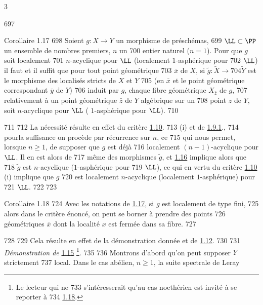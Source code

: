3	\documentclass[10pt]{../fichiers-configuration-latex/smfart}
\begin{document}
   697	\begin{enonce*}{Corollaire 1.17}
   698	Soient $g:X\rightarrow Y$ un morphisme de préschémas,
   699	$\LL\subset \PP$ un ensemble de nombres premiers, $n$ un
   700	entier naturel (\resp $n=1$). Pour que $g$ soit localement
   701	$n$-acyclique pour $\LL$ (\resp localement $1$-asphérique pour
   702	$\LL$) il faut et il suffit que pour tout point géométrique
   703	$\bar{x}$ de $X$, si $\widetilde{g}:\widetilde{X}\rightarrow
   704	\widetilde{Y}$ est le morphisme des localisés stricts de $X$ et $Y$
   705	(en $\bar{x}$ et le point géométrique correspondant $\bar{y}$ de $Y$)
   706	induit par $g$, chaque fibre géométrique $X_{\bar{z}}$ de $g$,
   707	relativement à un point géométrique $\bar{z}$ de $Y$ algébrique sur un
   708	point $z$ de $Y$, soit $n$-acyclique pour $\LL$ (	$1$-asphérique pour $\LL$).
   710	\end{enonce*}
   711	
   712	La nécessité résulte en effet du critère \hyperref[XV.prop1.10]{1.10}. 
   713	(i) et de \hyperref[XV.cor1.9.1]{1.9.1}.,
   714	pour\pageoriginale la suffisance on procède par récurrence sur $n$, ce
   715	qui nous permet, lorsque $n\geq 1$, de supposer que $g$ est déjà
   716	localement $(n-1)$-acyclique pour $\LL$. Il en est alors de
   717	même des morphismes $\widetilde{g}$, et \hyperref[XV.cor1.16]{1.16} implique alors que
   718	$\widetilde{g}$ est $n$-acyclique (\resp $1$-asphérique pour
   719	$\LL$), ce qui en vertu du critère \hyperref[XV.prop1.10]{1.10} (i) implique que $g$
   720	est localement $n$-acyclique (\resp localement $1$-asphérique) pour
   721	$\LL$.
   722	
   723	\begin{enonce*}{Corollaire 1.18}
   724	Avec les notations de \hyperref[XV.cor1.17]{1.17}, si $g$ est localement de type fini,
   725	alors dans le critère énoncé, on peut se borner à prendre des points
   726	géométriques $\bar{x}$ dont la localité $x$ est fermée dans sa fibre.
   727	\end{enonce*}
   728	
   729	Cela résulte en effet de la démonstration donnée et de \hyperref[XV.cor1.12]{1.12}.
   730	
   731		\emph{Démonstration de} \hyperref[XV.thm1.15]{1.15} \footnote[1]{Le lecteur qui ne
   733	s'intéresserait qu'au cas noethérien est invité à se reporter à
   734	\hyperref[XV.rem1.18]{1.18}.}.
   735	%
   736	Montrons d'abord qu'on peut supposer $Y$ strictement
   737	local. Dans le cas abélien, $n\geq 1$, la suite spectrale de Leray
\end{document}
